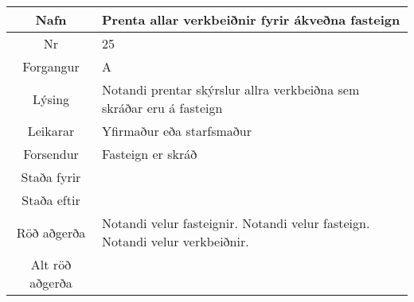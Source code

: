 \documentclass[a4paper]{article}
\begin{document}
\begin{tabular}{|c|p{10cm}|}
\hline
Nafn&Prenta allar verkbeiðnir fyrir ákveðna fasteign\\
\hline
Nr&25\\
\hline
Forgangur&A\\
\hline
Lýsing&Notandi prentar skýrslur allra verkbeiðna sem skráðar eru á fasteign\\
\hline
Leikarar&Yfirmaður eða starfsmaður\\
\hline
Forsendur&Fasteign er skráð\\
\hline
Staða fyrir&\\
\hline
Staða eftir&\\
\hline
Röð aðgerða&Notandi velur fasteignir. Notandi velur fasteign. Notandi velur verkbeiðnir.\\
\hline
Alt röð aðgerða&\\
\hline
\end{tabular}
\end{document}
